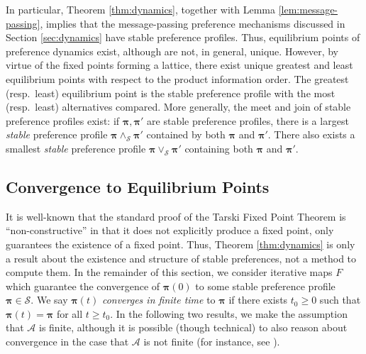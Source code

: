 \documentclass[conference]{ieeeconf}
\newcommand{\N}{\mathcal{N}}
\newcommand{\A}{\mathcal{A}}
\renewcommand{\SS}{\mathcal{S}}
\newcommand{\Pref}{\mathsf{Pre}}
\newcommand{\profile}{\boldsymbol{\pi}}
\newcommand{\join}{\vee}
\newcommand{\meet}{\wedge}
\renewcommand{\geq}{\geqslant}
\DeclareMathOperator{\Aggregate}{Aggregate}
\newtheorem{corollary}{Corollary}
\begin{document}
In particular, Theorem \ref{thm:dynamics}, together with Lemma \ref{lem:message-passing}, implies that the message-passing preference mechanisms discussed in Section \ref{sec:dynamics} have stable preference profiles. Thus, equilibrium points of preference dynamics exist, although are not, in general, unique. However, by virtue of the fixed points forming a lattice, there exist unique greatest and least equilibrium points with respect to the product information order. The greatest (resp.~least) equilibrium point is the stable preference profile with the most (resp.~least) alternatives compared. More generally, the meet and join of stable preference profiles exist: if $\profile, \profile'$ are stable preference profiles, there is a largest \emph{stable} preference profile $\profile \meet_{\SS} \profile'$ contained by both $\profile$ and $\profile'$. There also exists a smallest \emph{stable} preference profile $\profile \join_{\SS} \profile'$ containing both $\profile$ and $\profile'$.


\vspace{-0.25em}
\subsection{Convergence to Equilibrium Points}
\vspace{-0.25em}

It is well-known that the standard proof of the Tarski Fixed Point Theorem is ``non-constructive'' \cite{cousot1979} in that it does not explicitly produce a fixed point, only guarantees the existence of a fixed point. Thus, Theorem \ref{thm:dynamics} is only a result about the existence and structure of stable preferences, not a method to compute them. In the remainder of this section, we consider iterative maps $F$ which guarantee the convergence of $\profile(0)$ to some stable preference profile $\profile \in \SS$. We say $\profile(t)$ \emph{converges in finite time} to $\profile$ if there exists $t_0 \geq 0$ such that $\profile(t) = \profile$ for all $t \geq t_0$. In the following two results, we make the assumption that $\A$ is finite, although it is possible (though technical) to also reason about convergence in the case that $\A$ is not finite (for instance, see \cite[Theorem 12.9]{roman2008}).
    
\end{document}
